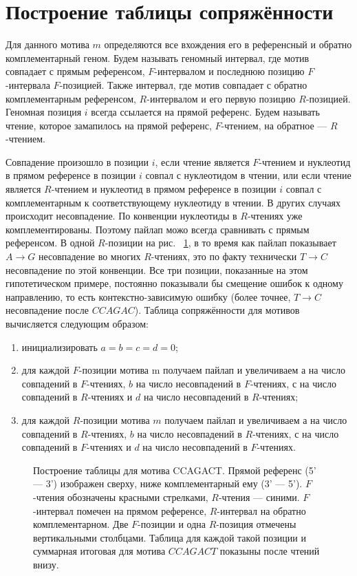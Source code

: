 \section {Построение таблицы сопряжённости}

	Для данного мотива $m$ определяются все вхождения его в референсный и обратно комплементарный геном. Будем называть геномный интервал, где мотив совпадает с прямым референсом, $F$-интервалом и последнюю позицию $F$-интервала $F$-позицией. Также интервал, где мотив совпадает с обратно комплементарным референсом, $R$-интервалом и его первую позицию $R$-позицией. Геномная позиция $i$ всегда ссылается на прямой референс. Будем называть чтение, которое замапилось на прямой референс, $F$-чтением, на обратное --- $R$-чтением.
	
	Совпадение произошло в позиции $i$, если чтение является $F$-чтением и нуклеотид в прямом референсе в позиции $i$ совпал с нуклеотидом в чтении, или если чтение является $R$-чтением и нуклеотид в прямом референсе в позиции $i$ совпал с комплементарным к соответствующему нуклеотиду в чтении. В других случаях происходит несовпадение. По конвенции нуклеотиды в $R$-чтениях уже комплементированы. Поэтому пайлап можо всегда сравнивать с прямым референсом.  В одной $R$-позиции на рис. ~\ref{table_construction}, в то время как пайлап показывает $A \to G$ несовпадение во многих $R$-чтениях, это по факту технически $T \to C$ несовпадение по этой конвенции. Все три позиции, показанные на этом гипотетическом примере, постоянно показывали бы смещение ошибок к одному направлению, то есть контекстно-зависимую ошибку (более точнее, $T \to C$ несовпадение после $CCAGAC$). Таблица сопряжённости для мотивов вычисляется следующим образом:
	\begin{enumerate} 
	\item инициализировать $a=b=c=d=0$;
 	\item для каждой $F$-позиции мотива m получаем пайлап и увеличиваем $а$ на число совпадений в $F$-чтениях, $b$ на число несовпадений в $F$-чтениях, $с$ на число совпадений в $R$-чтениях и $d$ на число несовпадений в $R$-чтениях;
	\item для каждой $R$-позиции мотива $m$ получаем пайлап и увеличиваем $а$ на число совпадений в $R$-чтениях, $b$ на число несовпадений в $R$-чтениях, $с$ на число совпадений в $F$-чтениях и $d$ на число несовпадений в $F$-чтениях.
	\end{enumerate} 
	
\begin{figure}[h!]
	\caption{Построение таблицы для мотива CCAGACT. Прямой референс (5' --- 3') изображен сверху, ниже комплементарный ему (3' --- 5'). $F$-чтения обозначены красными стрелками, $R$-чтения --- синими. $F$-интервал помечен на прямом референсе, $R$-интервал на обратно комплементарном. Две $F$-позиции и одна $R$-позиция отмечены вертикальными столбцами. Таблица для каждой такой позиции и суммарная итоговая для мотива $CCAGACT$ показыны после чтений внизу.}
	\label{table_construction}
	\end{figure}

